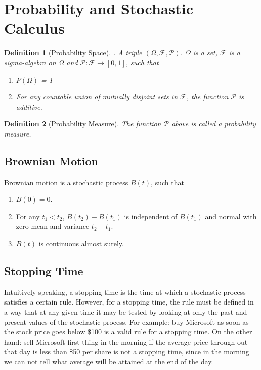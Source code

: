 \documentclass{amsart}
\theoremstyle{plain}
\newtheorem{definition}{Definition}
\numberwithin{equation}{section}
\begin{document}
\section{Probability and Stochastic Calculus}

\begin{definition}[Probability Space]. 
A triple $(\Omega, \mathcal{F}, \mathcal{P})$.
$\Omega$ is a set, $\mathcal{F}$ is a sigma-algebra
on $\Omega$ and $\mathcal{P}: \mathcal{F} \to [0, 1]$,
such that 
\begin{enumerate}
	\item $P(\Omega)$ = 1
	\item For any countable union of mutually disjoint sets in $\mathcal{F}$, the 
	function $\mathcal{P}$ is additive.
\end{enumerate}
\end{definition}
\begin{definition}[Probability Measure]
The function $\mathcal{P}$ above is called a probability measure.
\end{definition}

\subsection*{Brownian Motion}
Brownian motion is a stochastic 
process $B(t)$, such that 
\begin{enumerate}
\item $B(0)=0$.
\item For any $t_1 < t_2$, $B(t_2)-B(t_1)$ is 
independent of $B(t_1)$ and normal with zero mean and 
variance $t_2-t_1$. 
\item $B(t)$ is continuous almost surely.
\end{enumerate}

\subsection*{Stopping Time}
Intuitively speaking, a stopping time 
is the time at which 
a stochastic process satisfies a 
certain rule. However, for a stopping time, the 
rule must be defined in a way that at any given time
it may be tested by looking at
only the past and present values of the 
stochastic process. 
For example: buy Microsoft as 
soon as the stock price goes below \$100 is a valid
rule for a stopping time. On the other hand: sell 
Microsoft first thing in the morning if the average price
through out that day is less than \$50 per share
is not a stopping time, since in the morning we can not 
tell what average will be attained at the end of 
the day. 
\end{document}
